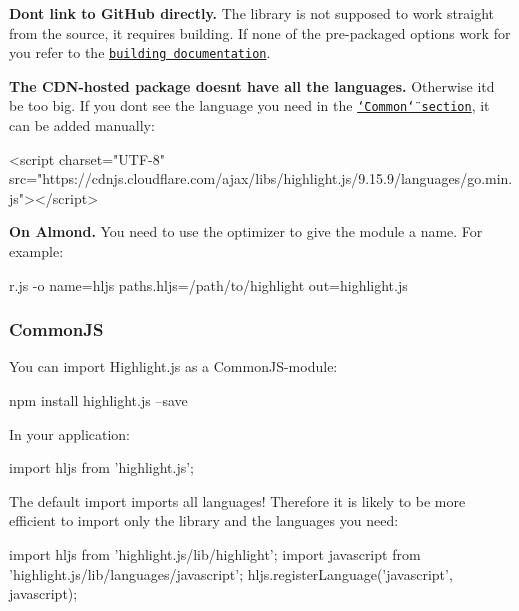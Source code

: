 {\bfseries Don\textquotesingle{}t link to Git\+Hub directly.} The library is not supposed to work straight from the source, it requires building. If none of the pre-\/packaged options work for you refer to the \href{http://highlightjs.readthedocs.io/en/latest/building-testing.html}{\tt building documentation}.

{\bfseries The C\+D\+N-\/hosted package doesn\textquotesingle{}t have all the languages.} Otherwise it\textquotesingle{}d be too big. If you don\textquotesingle{}t see the language you need in the \href{https://highlightjs.org/download/}{\tt \char`\"{}\+Common\char`\"{} section}, it can be added manually\+:


\begin{DoxyCode}
<script
 charset="UTF-8"
 src="https://cdnjs.cloudflare.com/ajax/libs/highlight.js/9.15.9/languages/go.min.js"></script>
\end{DoxyCode}


{\bfseries On Almond.} You need to use the optimizer to give the module a name. For example\+:


\begin{DoxyCode}
r.js -o name=hljs paths.hljs=/path/to/highlight out=highlight.js
\end{DoxyCode}


\subsubsection*{Common\+JS}

You can import Highlight.\+js as a Common\+J\+S-\/module\+:


\begin{DoxyCode}
npm install highlight.js --save
\end{DoxyCode}


In your application\+:


\begin{DoxyCode}
import hljs from 'highlight.js';
\end{DoxyCode}


The default import imports all languages! Therefore it is likely to be more efficient to import only the library and the languages you need\+:


\begin{DoxyCode}
import hljs from 'highlight.js/lib/highlight';
import javascript from 'highlight.js/lib/languages/javascript';
hljs.registerLanguage('javascript', javascript);
\end{DoxyCode}


